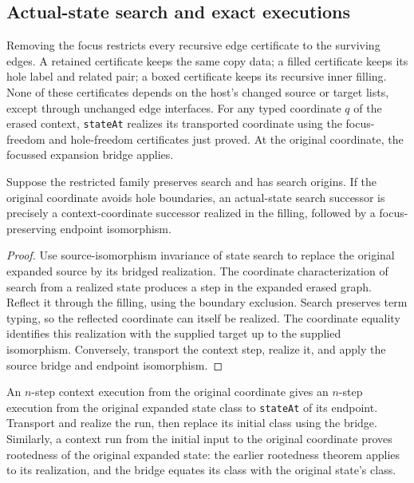 \subsection{Actual-state search and exact executions}
Removing the focus restricts every recursive edge certificate to the surviving
edges. A retained certificate keeps the same copy data; a filled certificate
keeps its hole label and related pair; a boxed certificate keeps its recursive
inner filling. None of these certificates depends on the host's changed source
or target lists, except through unchanged edge interfaces.
For any typed coordinate $q$ of the erased context, \texttt{stateAt} realizes
its transported coordinate using the focus-freedom and hole-freedom certificates
just proved. At the original coordinate, the focussed expansion bridge applies.
\begin{theorem}
Suppose the restricted family preserves search and has search origins. If the
original coordinate avoids hole boundaries, an actual-state search successor
is precisely a context-coordinate successor realized in the filling, followed
by a focus-preserving endpoint isomorphism.
\end{theorem}
\begin{proof}
Use source-isomorphism invariance of state search to replace the original
expanded source by its bridged realization. The coordinate characterization of
search from a realized state produces a step in the expanded erased graph.
Reflect it through the filling, using the boundary exclusion. Search preserves
term typing, so the reflected coordinate can itself be realized. The coordinate
equality identifies this realization with the supplied target up to the supplied
isomorphism. Conversely, transport the context step, realize it, and apply the
source bridge and endpoint isomorphism.
\end{proof}
An $n$-step context execution from the original coordinate gives an $n$-step
execution from the original expanded state class to \texttt{stateAt} of its
endpoint. Transport and realize the run, then replace its initial class using
the bridge. Similarly, a context run from the initial input to the original
coordinate proves rootedness of the original expanded state: the earlier
rootedness theorem applies to its realization, and the bridge equates its class
with the original state's class.

